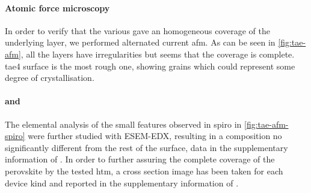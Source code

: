 	\paragraph{Atomic force microscopy}
	In order to verify that the various  gave an homogeneous coverage of the underlying layer, we performed alternated current \gls{afm}.
	As can be seen in \cref{fig:tae-afm}, all the layers have irregularities but seems that the coverage is complete.
	\Gls{tae4} surface is the most rough one, showing grains which could represent some degree of crystallisation.

	
\begin{figure}
\end{figure}

	\paragraph{ and }
		The elemental analysis of the small features observed in \gls{spiro} in \cref{fig:tae-afm-spiro} were further studied with ESEM-EDX, resulting in a composition no significantly different from the rest of the surface, data in the supplementary information of \cite{Gelmetti2019}.
		In order to further assuring the complete coverage of the perovskite by the tested \gls{htm}, a cross section image has been taken for each device kind and reported in the supplementary information of \cite{Gelmetti2019}.


